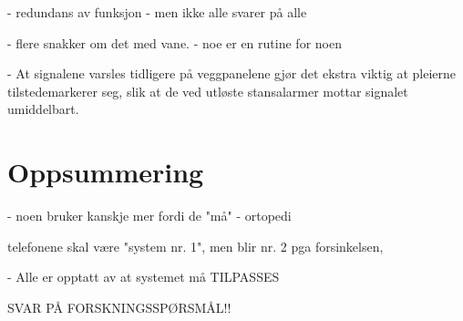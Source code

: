 - redundans av funksjon
	- men ikke alle svarer på alle
	
- flere snakker om det med vane.
 - noe er en rutine for noen
 
- At signalene varsles tidligere på veggpanelene gjør det ekstra viktig at pleierne tilstedemarkerer seg, slik at de ved utløste stansalarmer mottar signalet umiddelbart. 


\section{Oppsummering}
- noen bruker kanskje mer fordi de "må" - ortopedi	

telefonene skal være "system nr. 1", men blir nr. 2 pga forsinkelsen,

- Alle er opptatt av at systemet må TILPASSES

SVAR PÅ FORSKNINGSSPØRSMÅL!!